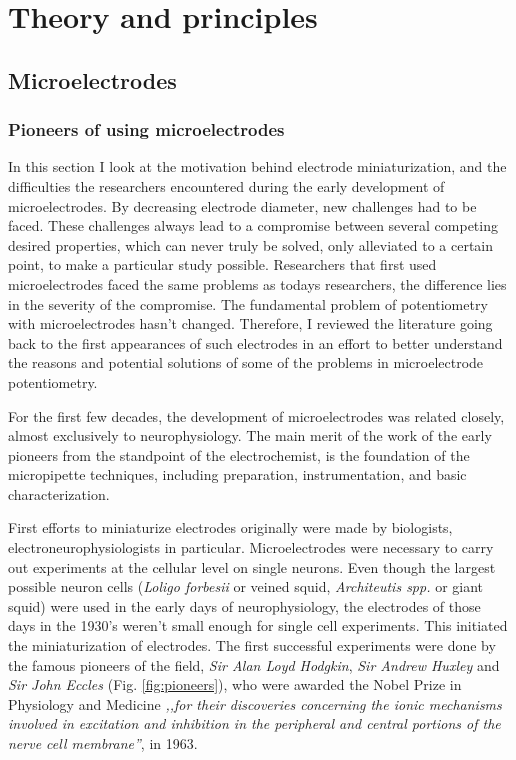 \chapter{Theory and principles}
\section{Microelectrodes}
\subsection{Pioneers of using microelectrodes}
In this section I look at the motivation behind electrode miniaturization, and the difficulties the researchers encountered during the early development of microelectrodes.
By decreasing electrode diameter, new challenges had to be faced.
These challenges always lead to a compromise between several competing desired properties, which can never truly be solved, only alleviated to a certain point, to make a particular study possible.
Researchers that first used microelectrodes faced the same problems as todays researchers, the difference lies in the severity of the compromise.
The fundamental problem of potentiometry with microelectrodes hasn't changed.
Therefore, I reviewed the literature going back to the first appearances of such electrodes in an effort to better understand the reasons and potential solutions of some of the problems in microelectrode potentiometry.

For the first few decades, the development of microelectrodes was related closely, almost exclusively to neurophysiology.
The main merit of the work of the early pioneers from the standpoint of the electrochemist, is the foundation of the micropipette techniques, including preparation, instrumentation, and basic characterization.

First efforts to miniaturize electrodes originally were made by biologists, electroneurophysiologists in particular.
Microelectrodes were necessary to carry out experiments at the cellular level on single neurons.
Even though the largest possible neuron cells (\emph{Loligo forbesii} or veined squid, \emph{Architeutis spp.} or giant squid) were used in the early days of neurophysiology, the electrodes of those days in the 1930's weren't small enough for single cell experiments.
This initiated the miniaturization of electrodes.
The first successful experiments were done by the famous pioneers of the field, \emph{Sir Alan Loyd Hodgkin}, \emph{Sir Andrew Huxley} and \emph{Sir John Eccles} (Fig. \ref{fig:pioneers}), who were awarded the Nobel Prize in Physiology and Medicine \emph{,,for their discoveries concerning the ionic mechanisms involved in excitation and inhibition in the peripheral and central portions of the nerve cell membrane''}, in 1963. 

